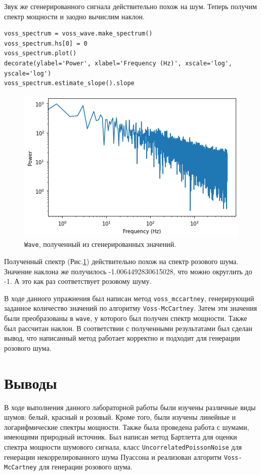 \documentclass[a4paper, 14pt]{extarticle}
\begin{document}
    Звук же сгенерированного сигнала действительно похож на шум. Теперь получим спектр мощности и заодно вычислим наклон.

    \begin{lstlisting}[caption= Вычисление логарифмического спектра., label={lst:task5_voss_spectrum}]
voss_spectrum = voss_wave.make_spectrum()
voss_spectrum.hs[0] = 0
voss_spectrum.plot()
decorate(ylabel='Power', xlabel='Frequency (Hz)', xscale='log', yscale='log')
voss_spectrum.estimate_slope().slope    \end{lstlisting}

    \begin{figure}[H]
        \centering
        \includegraphics[width=0.75\linewidth]{resources/Images/task5_voss_spectrum}
        \caption{\texttt{Wave}, полученный из сгенерированных значений.}
        \label{fig:task5_voss_spectrum}
    \end{figure}

    Полученный спектр (Рис.\ref{fig:task5_voss_spectrum}) действительно похож на спектр розового шума. Значение наклона
    же получилось -1.0064492830615028, что можно округлить до -1. А это как раз соответствует розовому шуму.

    В ходе данного упражнения был написан метод \texttt{voss\_mccartney}, генерирующий заданное количество значений по
    алгоритму \texttt{Voss-McCartney}. Затем эти значения были преобразованы в \texttt{wave}, у которого был получен
    спектр мощности. Также был рассчитан наклон. В соответствии с полученными результатами был сделан вывод, что
    написанный метод работает корректно и подходит для генерации розового шума.

    \newpage

    \section{Выводы}
    \label{sec:conclusions}

    В ходе выполнения данного лабораторной работы были изучены различные виды шумов: белый, красный и розовый.
    Кроме того, были изучены линейные и логарифмические спектры мощности. Также была проведена работа с шумами,
    имеющими природный источник. Был написан метод Бартлетта для оценки спектра мощности шумового сигнала, класс
    \texttt{UncorrelatedPoissonNoise} для генерации некоррелированного шума Пуассона и реализован алгоритм
    \texttt{Voss-McCartney} для генерации розового шума.
\end{document}
